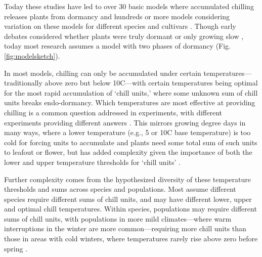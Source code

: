 \documentclass[11pt]{article}
\begin{document}
Today these studies have led to over 30 basic models where accumulated chilling releases plants from dormancy and hundreds or more models considering variation on these models for different species and cultivars \citep[][]{basler2016evaluating,hufkens2018integrated}. Though early debates considered whether plants were truly dormant or only growing slow \citep[`dormancy' or `rest' versus `quiescent';][]{considine2016language}, today most research assumes a model with two phases of dormancy (Fig. \ref{fig:modelsketch}). 

In most models, chilling can only be accumulated under certain temperatures---traditionally above zero but below 10\degree C---with certain temperatures 
being optimal for the most rapid accumulation of `chill units,' where some unknown sum of chill units breaks endo-dormancy. Which temperatures are most effective at providing chilling is a common question addressed in experiments, with different experiments providing different answers \citep{vitasselev,baum2021}. This mirrors growing degree days in many ways, where a lower temperature (e.g., 5 or 10\degree C base temperature) is too cold for forcing units to accumulate and plants need some total sum of such units to leafout or flower, but has added complexity given the importance of both the lower and upper temperature thresholds for `chill units' \citep[whereas growing degree day models can often ignore the upper threshold, estimated at 25\degree C or above, as it is rarely reached in natural spring conditions][]{mcmaster1997growing,li2021comparisons}. %

Further complexity comes from the hypothesized diversity of these temperature thresholds and sums across species and populations. Most assume different species require different sums of chill units, and may have different lower, upper and optimal chill temperatures. Within species, populations may require different sums of chill units, with populations in more mild climates---where warm interruptions in the winter are more common---requiring more chill units than those in areas with cold winters, where temperatures rarely rise above zero before spring \citep{campbell1979,leinonen1996dependence}. 
\end{document}
